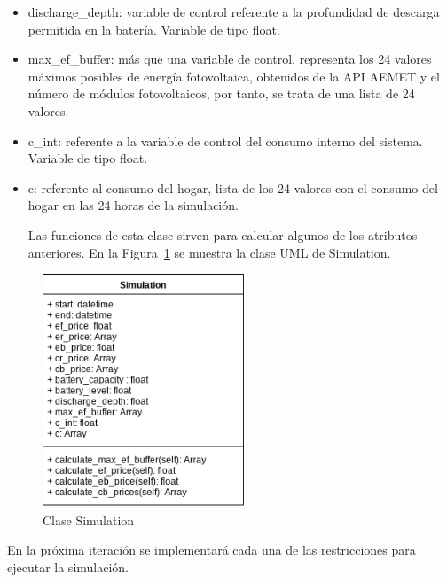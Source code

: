 \begin{itemize}
        \item discharge\_depth: variable de control referente a la profundidad de descarga permitida en la batería. Variable de tipo float.
        \item max\_ef\_buffer: más que una variable de control, representa los 24 valores máximos posibles de energía fotovoltaica, obtenidos de la API AEMET y el número de módulos fotovoltaicos, por tanto, se trata de una lista de 24 valores.
        \item c\_int: referente a la variable de control del consumo interno del sistema. Variable de tipo float.
        \item c: referente al consumo del hogar, lista de los 24 valores con el consumo del hogar en las 24 horas de la simulación.

Las funciones de esta clase sirven para calcular algunos de los atributos anteriores. En la Figura~\ref{fig:simulation} se muestra la clase UML de Simulation.
\end{itemize}

\begin{figure}[H]
        \centering
        \includegraphics[width=6cm]{figs/simulation_class.png}
        \caption{Clase Simulation}
        \label{fig:simulation}
\end{figure}

En la próxima iteración se implementará cada una de las restricciones para ejecutar la simulación.
